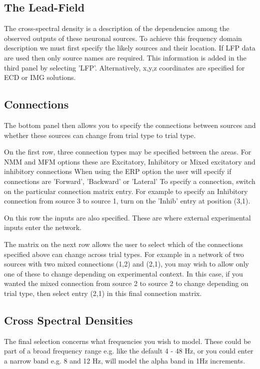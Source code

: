 \subsection{The Lead-Field}
The cross-spectral density is a description of the dependencies among the observed outputs of these neuronal sources. To achieve this frequency domain description we must first specify the likely sources and their location. If LFP data are used then only source names are required. This information is added in the third panel by selecting 'LFP'. Alternatively, x,y,z coordinates are specified for ECD or IMG solutions. 


\subsection{Connections}
The bottom panel then allows you to specify the connections between sources and whether these sources can change from trial type to trial type. 

On the first row, three connection types may be specified between the areas. For NMM and MFM options these are Excitatory, Inhibitory or Mixed excitatory and inhibitory connections When using the ERP option the user will specify if connections are 'Forward', 'Backward' or 'Lateral' To specify a connection, switch on the particular connection matrix entry. For example to specify an Inhibitory connection from source 3 to source 1, turn on the 'Inhib' entry at position (3,1).

On this row the inputs are also specified. These are where external experimental inputs enter the network.

The matrix on the next row allows the user to select which of the connections specified above can change across trial types. For example in a network of two sources with two mixed connections (1,2) and (2,1), you may wish to allow only one of these to change depending on experimental context. In this case, if you wanted the mixed connection from source 2 to source 2 to change depending on trial type, then select entry (2,1) in this final connection matrix.


\subsection{Cross Spectral Densities}
The final selection concerns what frequencies you wish to model. These could be part of a broad frequency range e.g. like the default 4 - 48 Hz, or you could enter a narrow band e.g. 8 and 12 Hz, will model the alpha band in 1Hz increments.


